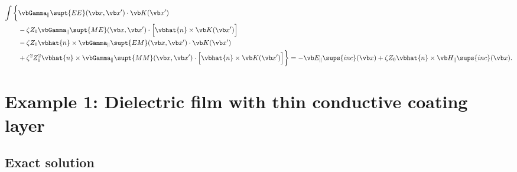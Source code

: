 \documentclass{article}
\newcommand{\BG}{\vbGamma}
\begin{document}
\begin{enumerate}
\begin{align*}
       \int\bigg\{ &\BG_{\parallel}\supt{EE}(\vb x, \vb x^\prime) 
                   \cdot \vb K(\vb x^\prime)
                   \\
                   &-\zeta Z_0\BG_{\parallel}\supt{ME}(\vb x, \vb x^\prime)
                   \cdot \Big[\vbhat{n}\times \vb K(\vb x^\prime)\Big] 
                   \\
                   &-\zeta Z_0\vbhat{n}\times \BG_{\parallel}\supt{EM}(\vb x, \vb x^\prime) 
                   \cdot \vb K(\vb x^\prime)
                   \\
                   &+\zeta^2 Z_0^2
                   \vbhat{n}\times\BG_{\parallel}\supt{MM}(\vb x, \vb x^\prime)
                   \cdot \Big[\vbhat{n}\times \vb K(\vb x^\prime)\Big]
       \bigg\}
       = -\vb E_{\parallel}\sups{inc}(\vb x) 
            +\zeta Z_0 \vbhat{n}\times \vb H_{\parallel}\sups{inc}(\vb x).
       \end{align*}
\end{enumerate}

\newpage
\section{Example 1: Dielectric film with thin conductive coating layer}

\subsection{Exact solution}
\label{FilmExactSolution}
\end{document}
